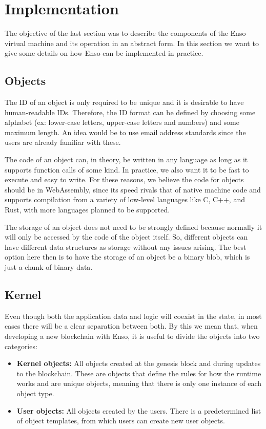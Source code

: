 \documentclass[conference]{IEEEtran}
\begin{document}
\section{Implementation}
The objective of the last section was to describe the components of the Enso virtual machine and its operation in an abstract form. In this section we want to give some details on how Enso can be implemented in practice.

\subsection{Objects}
The ID of an object is only required to be unique and it is desirable to have human-readable IDs. Therefore, the ID format can be defined by choosing some alphabet (ex: lower-case letters, upper-case letters and numbers) and some maximum length. An idea would be to use email address standards since the users are already familiar with these.

The code of an object can, in theory, be written in any language as long as it supports function calls of some kind. In practice, we also want it to be fast to execute and easy to write. For these reasons, we believe the code for objects should be in WebAssembly, since its speed rivals that of native machine code and supports compilation from a variety of low-level languages like C, C++, and Rust, with more languages planned to be supported.

The storage of an object does not need to be strongly defined because normally it will only be accessed by the code of the object itself. So, different objects can have different data structures as storage without any issues arising. The best option here then is to have the storage of an object be a binary blob, which is just a chunk of binary data.

\subsection{Kernel}
Even though both the application data and logic will coexist in the state, in most cases there will be a clear separation between both. By this we mean that, when developing a new blockchain with Enso, it is useful to divide the objects into two categories:

\begin{itemize}
	\item \textbf{Kernel objects:} All objects created at the genesis block and during updates to the blockchain. These are objects that define the rules for how the runtime works and are unique objects, meaning that there is only one instance of each object type.
	\item \textbf{User objects:} All objects created by the users. There is a predetermined list of object templates, from which users can create new user objects.
\end{itemize}
\end{document}
